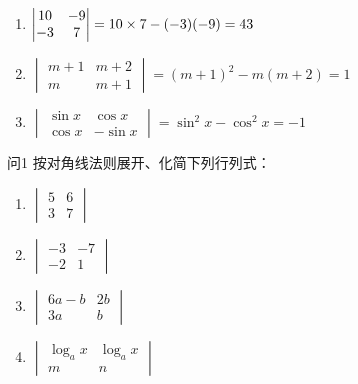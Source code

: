 \begin{solution}
  \begin{enumerate}[(1)]
  \item $\begin{vmatrix}
    10&-9\\ -3&7
  \end{vmatrix}=10\times 7-(-3)(-9)=43$
  \item $\begin{vmatrix}
    m+1& m+2\\ m & m+1
  \end{vmatrix}=(m+1)^2-m(m+2)=1$
  \item $\begin{vmatrix}
    \sin x& \cos x\\ \cos x& -\sin x
  \end{vmatrix}=\sin^2 x-\cos^2 x=-1$
  \end{enumerate}
\end{solution}

\begin{thm}{问1}
  按对角线法则展开、化简下列行列式：
\begin{multicols}{2}
\begin{enumerate}[(1)]
  \item $\begin{vmatrix}
    5&6\\3&7
  \end{vmatrix}$
  \item $\begin{vmatrix}
   -3&-7\\-2&1
  \end{vmatrix}$
  \item $\begin{vmatrix}
    6a-b&2b\\ 3a&b
  \end{vmatrix}$
  \item $\begin{vmatrix}
    \log_a x & \log_a x\\m&n
  \end{vmatrix}$
\end{enumerate}
\end{multicols}
\end{thm}

